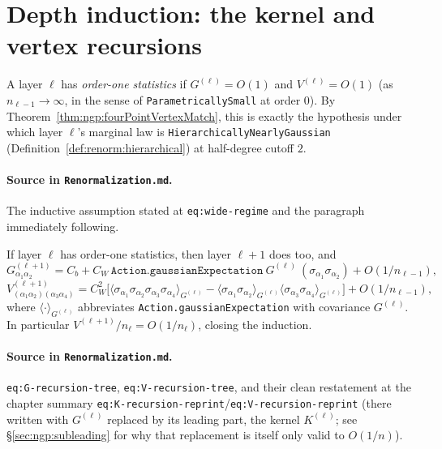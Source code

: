 \section{Depth induction: the kernel and vertex recursions}
\label{sec:ngp:induction}

\begin{definition}
\label{def:ngp:orderOneLayer}
A layer $\ell$ has \emph{order-one statistics} if $G^{(\ell)}=O(1)$ and $V^{(\ell)}=O(1)$
(as $n_{\ell-1}\to\infty$, in the sense of \texttt{ParametricallySmall} at order $0$). By
Theorem~\ref{thm:ngp:fourPointVertexMatch}, this is exactly the hypothesis under which layer
$\ell$'s marginal law is \texttt{HierarchicallyNearlyGaussian}
(Definition~\ref{def:renorm:hierarchical}) at half-degree cutoff $2$.

\paragraph{Source in \texttt{Renormalization.md}.}
The inductive assumption stated at \texttt{eq:wide-regime} and the paragraph immediately following.
\end{definition}

\begin{theorem}
\label{thm:ngp:depthRecursion}
If layer $\ell$ has order-one statistics, then layer $\ell+1$ does too, and
\[
  G^{(\ell+1)}_{\alpha_1\alpha_2}=C_b+C_W\,
    \texttt{Action.gaussianExpectation}\ G^{(\ell)}\
    (\sigma_{\alpha_1}\sigma_{\alpha_2}) + O(1/n_{\ell-1}),
\]
\[
  V^{(\ell+1)}_{(\alpha_1\alpha_2)(\alpha_3\alpha_4)}
  = C_W^2\Big[\langle\sigma_{\alpha_1}\sigma_{\alpha_2}\sigma_{\alpha_3}\sigma_{\alpha_4}\rangle_{G^{(\ell)}}
   -\langle\sigma_{\alpha_1}\sigma_{\alpha_2}\rangle_{G^{(\ell)}}
    \langle\sigma_{\alpha_3}\sigma_{\alpha_4}\rangle_{G^{(\ell)}}\Big] + O(1/n_{\ell-1}),
\]
where $\langle\cdot\rangle_{G^{(\ell)}}$ abbreviates \texttt{Action.gaussianExpectation}
with covariance $G^{(\ell)}$. In particular $V^{(\ell+1)}/n_\ell=O(1/n_\ell)$, closing the
induction.

\paragraph{Source in \texttt{Renormalization.md}.}
\texttt{eq:G-recursion-tree}, \texttt{eq:V-recursion-tree}, and their clean restatement at the
chapter summary \texttt{eq:K-recursion-reprint}/\texttt{eq:V-recursion-reprint} (there written with
$G^{(\ell)}$ replaced by its leading part, the kernel $K^{(\ell)}$; see
\S\ref{sec:ngp:subleading} for why that replacement is itself only valid to $O(1/n)$).
\end{theorem}

